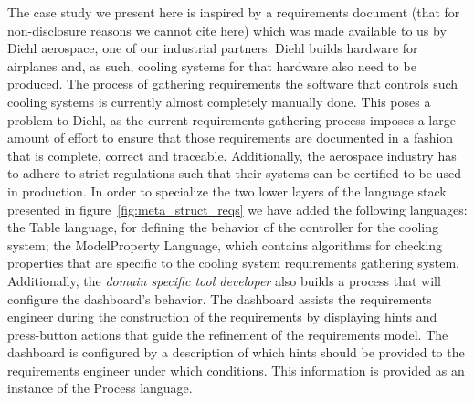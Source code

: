 The case study we present here is inspired by a requirements document (that for
non-disclosure reasons we cannot cite here) which was made available to us by
Diehl aerospace, one of our industrial partners. Diehl builds hardware for
airplanes and, as such, cooling systems for that hardware also need to be
produced. The process of gathering requirements the software that controls such
cooling systems is currently almost completely manually done. This poses a
problem to Diehl, as the current requirements gathering process imposes a large
amount of effort to ensure that those requirements are documented in a fashion
that is complete, correct and traceable. Additionally, the aerospace industry
has to adhere to strict regulations such that their systems can be certified to
be used in production.
In order to specialize the two lower layers of the language stack presented in
figure~\ref{fig:meta_struct_reqs} we have added the following languages: the
\textsf{Table} language, for defining the behavior of the controller for the
cooling system; the \textsf{ModelProperty} Language, which contains algorithms
for checking properties that are specific to the cooling system requirements
gathering system. Additionally, the \emph{domain specific tool developer} also
builds a process that will configure the dashboard's behavior. The dashboard assists the
requirements engineer during the construction of the requirements by displaying
hints and press-button actions that guide the refinement of the requirements
model. The dashboard is configured by a description of which hints should be
provided to the requirements engineer under which conditions. This information
is provided as an instance of the \textsf{Process} language.

